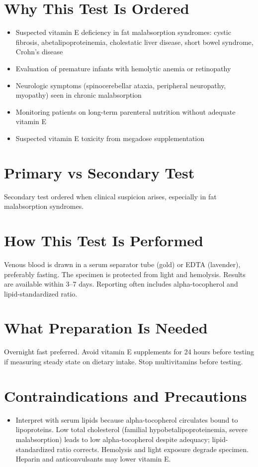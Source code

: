 \section*{Why This Test Is Ordered}
\begin{itemize}
  \item Suspected vitamin E deficiency in fat malabsorption syndromes: cystic fibrosis, abetalipoproteinemia, cholestatic liver disease, short bowel syndrome, Crohn's disease
  \item Evaluation of premature infants with hemolytic anemia or retinopathy
  \item Neurologic symptoms (spinocerebellar ataxia, peripheral neuropathy, myopathy) seen in chronic malabsorption
  \item Monitoring patients on long-term parenteral nutrition without adequate vitamin E
  \item Suspected vitamin E toxicity from megadose supplementation
\end{itemize}

\section*{Primary vs Secondary Test}
Secondary test ordered when clinical suspicion arises, especially in fat malabsorption syndromes.

\section*{How This Test Is Performed}
Venous blood is drawn in a serum separator tube (gold) or EDTA (lavender), preferably fasting. The specimen is protected from light and hemolysis. Results are available within 3--7 days. Reporting often includes alpha-tocopherol and lipid-standardized ratio.

\section*{What Preparation Is Needed}
Overnight fast preferred. Avoid vitamin E supplements for 24 hours before testing if measuring steady state on dietary intake. Stop multivitamins before testing.

\section*{Contraindications and Precautions}
\begin{itemize}
  \item Interpret with serum lipids because alpha-tocopherol circulates bound to lipoproteins. Low total cholesterol (familial hypobetalipoproteinemia, severe malabsorption) leads to low alpha-tocopherol despite adequacy; lipid-standardized ratio corrects. Hemolysis and light exposure degrade specimen. Heparin and anticonvulsants may lower vitamin E.
\end{itemize}
